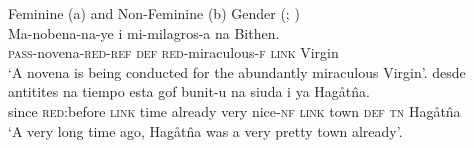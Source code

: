 \documentclass[output=collectionpaper]{langsci/langscibook}
\begin{document}
\ea\label{ex:dgm:8:Chamorro}
 Feminine (a) and Non-Feminine (b) Gender (; \citealt[123]{Stolz2012})\\
\ea
\gll Ma-nobena-na-ye i mi-milagros-a na Bithen. \\
\textsc{pass-}novena-\textsc{red-ref} \textsc{def} \textsc{red}-miraculous-\textsc{f} \textsc{link} Virgin \\
\glt`A novena is being conducted for the abundantly miraculous Virgin'.
\ex
\gll desde antitites na tiempo esta gof bunit-u na siuda i ya Hag\r{a}t\^na. \\
since \textsc{red:}before \textsc{link} time already very nice-\textsc{nf} \textsc{link} town \textsc{def} \textsc{tn} Hag\r{a}t\^na \\
\glt `A very long time ago,  Hag\r{a}t\^na was a very pretty town already'.
\z
\z
\end{document}
